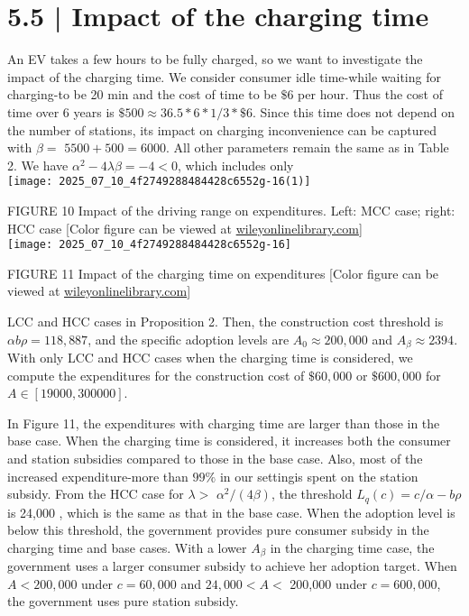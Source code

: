 \documentclass[10pt]{article}
\begin{document}
\section*{5.5 | Impact of the charging time}
An EV takes a few hours to be fully charged, so we want to investigate the impact of the charging time. We consider consumer idle time-while waiting for charging-to be 20 min and the cost of time to be $\$ 6$ per hour. Thus the cost of time over 6 years is $\$ 500 \approx 36.5 * 6 * 1 / 3 * \$ 6$. Since this time does not depend on the number of stations, its impact on charging inconvenience can be captured with $\beta=$ $5500+500=6000$. All other parameters remain the same as in Table 2. We have $\alpha^{2}-4 \lambda \beta=-4<0$, which includes only\\
\texttt{[image: 2025\_07\_10\_4f2749288484428c6552g-16(1)]}

FIGURE 10 Impact of the driving range on expenditures. Left: MCC case; right: HCC case [Color figure can be viewed at \href{http://wileyonlinelibrary.com}{wileyonlinelibrary.com}]\\
\texttt{[image: 2025\_07\_10\_4f2749288484428c6552g-16]}

FIGURE 11 Impact of the charging time on expenditures [Color figure can be viewed at \href{http://wileyonlinelibrary.com}{wileyonlinelibrary.com}]

LCC and HCC cases in Proposition 2. Then, the construction cost threshold is $\alpha b \rho=118,887$, and the specific adoption levels are $A_{0} \approx 200,000$ and $A_{\beta} \approx 2394$. With only LCC and HCC cases when the charging time is considered, we compute the expenditures for the construction cost of $\$ 60,000$ or $\$ 600,000$ for $A \in[19000,300000]$.

In Figure 11, the expenditures with charging time are larger than those in the base case. When the charging time is considered, it increases both the consumer and station subsidies compared to those in the base case. Also, most of the increased expenditure-more than $99 \%$ in our settingis spent on the station subsidy. From the HCC case for $\lambda>$ $\alpha^{2} /(4 \beta)$, the threshold $L_{q}(c)=c / \alpha-b \rho$ is 24,000 , which is the same as that in the base case. When the adoption level is below this threshold, the government provides pure consumer subsidy in the charging time and base cases. With a lower $A_{\beta}$ in the charging time case, the government uses a larger consumer subsidy to achieve her adoption target. When $A<200,000$ under $c=60,000$ and $24,000<A<$ 200,000 under $c=600,000$, the government uses pure station subsidy.
\end{document}
